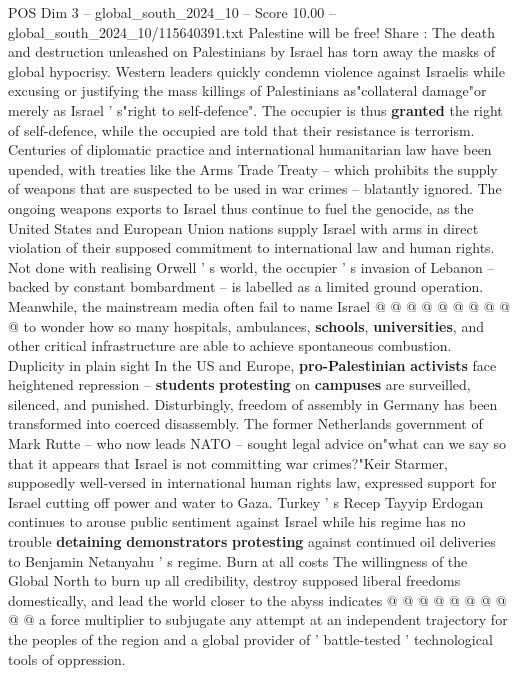 \begin{textsample}{POS Dim 3 – global\_south\_2024\_10 – Score 10.00 – global\_south\_2024\_10/115640391.txt}  \label{ex:f3_pos_361}
Palestine will be free!
Share : The death and destruction unleashed on Palestinians by Israel has torn away the masks of global hypocrisy.
Western leaders quickly condemn violence against Israelis while excusing or justifying the mass killings of Palestinians as"collateral damage"or merely as Israel ' s"right to self-defence".
The occupier is thus \textbf{granted} the right of self-defence, while the occupied are told that their resistance is terrorism.
Centuries of diplomatic practice and international humanitarian law have been upended, with treaties like the Arms Trade Treaty -- which prohibits the supply of weapons that are suspected to be used in war crimes -- blatantly ignored.
The ongoing weapons exports to Israel thus continue to fuel the genocide, as the United States and European Union nations supply Israel with arms in direct violation of their supposed commitment to international law and human rights.
Not done with realising Orwell ' s world, the occupier ' s invasion of Lebanon -- backed by constant bombardment -- is labelled as a limited ground operation.
Meanwhile, the mainstream media often fail to name Israel @ @ @ @ @ @ @ @ @ @ to wonder how so many hospitals, ambulances, \textbf{schools}, \textbf{universities}, and other critical infrastructure are able to achieve spontaneous combustion.
Duplicity in plain sight In the US and Europe, \textbf{pro-Palestinian} \textbf{activists} face heightened repression -- \textbf{students} \textbf{protesting} on \textbf{campuses} are surveilled, silenced, and punished.
Disturbingly, freedom of assembly in Germany has been transformed into coerced disassembly.
The former Netherlands government of Mark Rutte -- who now leads NATO -- sought legal advice on"what can we say so that it appears that Israel is not committing war crimes?"Keir Starmer, supposedly well-versed in international human rights law, expressed support for Israel cutting off power and water to Gaza.
Turkey ' s Recep Tayyip Erdogan continues to arouse public sentiment against Israel while his regime has no trouble \textbf{detaining} \textbf{demonstrators} \textbf{protesting} against continued oil deliveries to Benjamin Netanyahu ' s regime.
Burn at all costs The willingness of the Global North to burn up all credibility, destroy supposed liberal freedoms domestically, and lead the world closer to the abyss indicates @ @ @ @ @ @ @ @ @ @ a force multiplier to subjugate any attempt at an independent trajectory for the peoples of the region and a global provider of ' battle-tested ' technological tools of oppression.

\end{textsample}
